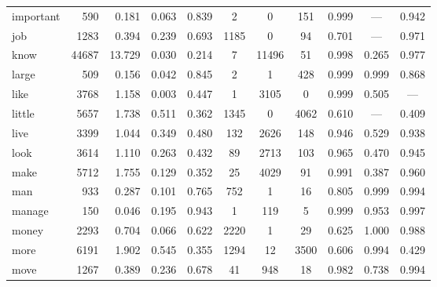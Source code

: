 \begin{landscape}
\begin{longtable}[c]{ l | r r c c | c c c | c c c }
  important  & 590   & 0.181                   & 0.063           & 0.839      & 2         & 0           & 151          & 0.999     & —           & 0.942\\
  job        & 1283  & 0.394                   & 0.239           & 0.693      & 1185      & 0           & 94           & 0.701     & —           & 0.971\\
  know       & 44687 & 13.729                  & 0.030           & 0.214      & 7         & 11496       & 51           & 0.998     & 0.265       & 0.977\\
  large      & 509   & 0.156                   & 0.042           & 0.845      & 2         & 1           & 428          & 0.999     & 0.999       & 0.868\\
  like       & 3768  & 1.158                   & 0.003           & 0.447      & 1         & 3105        & 0            & 0.999     & 0.505       & —\\
  little     & 5657  & 1.738                   & 0.511           & 0.362      & 1345      & 0           & 4062         & 0.610     & —           & 0.409\\
  live       & 3399  & 1.044                   & 0.349           & 0.480      & 132       & 2626        & 148          & 0.946     & 0.529       & 0.938\\
  look       & 3614  & 1.110                   & 0.263           & 0.432      & 89        & 2713        & 103          & 0.965     & 0.470       & 0.945\\
  make       & 5712  & 1.755                   & 0.129           & 0.352      & 25        & 4029        & 91           & 0.991     & 0.387       & 0.960\\
  man        & 933   & 0.287                   & 0.101           & 0.765      & 752       & 1           & 16           & 0.805     & 0.999       & 0.994\\
  manage     & 150   & 0.046                   & 0.195           & 0.943      & 1         & 119         & 5            & 0.999     & 0.953       & 0.997\\
  money      & 2293  & 0.704                   & 0.066           & 0.622      & 2220      & 1           & 29           & 0.625     & 1.000       & 0.988\\
  more       & 6191  & 1.902                   & 0.545           & 0.355      & 1294      & 12          & 3500         & 0.606     & 0.994       & 0.429\\
  move       & 1267  & 0.389                   & 0.236           & 0.678      & 41        & 948         & 18           & 0.982     & 0.738       & 0.994\\

\end{longtable}
\end{landscape}
